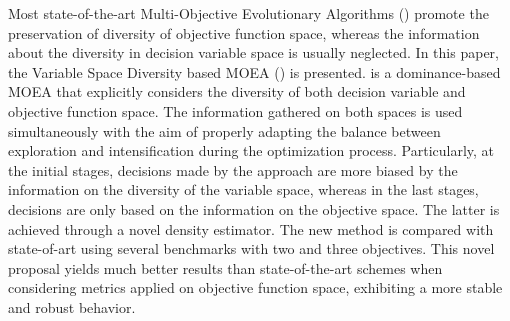 Most state-of-the-art Multi-Objective Evolutionary Algorithms (\MOEAS{}) promote the preservation of diversity 
of objective function space, whereas the information about the diversity in decision variable space is usually neglected.
%
In this paper, the Variable Space Diversity based MOEA (\VSDMOEA{}) is presented.
%
\VSDMOEA{} is a dominance-based MOEA that explicitly considers the diversity of both decision variable and objective function space.
%
The information gathered on both spaces is used simultaneously with the aim of properly adapting the balance between exploration
and intensification during the optimization process.
%
Particularly, at the initial stages, decisions made by the approach are more biased by the information on the diversity of 
the variable space, whereas in the last stages, decisions are only based on the information on the objective space.
%
The latter is achieved through a novel density estimator.
%
The new method is compared with state-of-art \MOEAS{} using several benchmarks with two and three objectives.
%
This novel proposal yields much better results than state-of-the-art schemes when considering metrics applied on 
objective function space, exhibiting a more stable and robust behavior.
